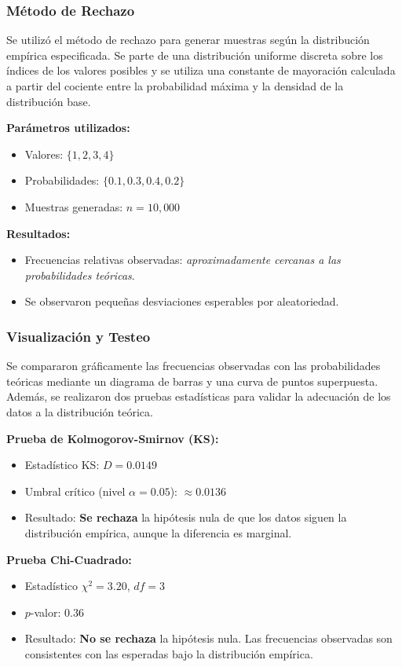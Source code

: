 \documentclass{article}
\begin{document}
\subsubsection{Método de Rechazo}

Se utilizó el método de rechazo para generar muestras según la distribución empírica especificada. Se parte de una distribución uniforme discreta sobre los índices de los valores posibles y se utiliza una constante de mayoración calculada a partir del cociente entre la probabilidad máxima y la densidad de la distribución base.

\textbf{Parámetros utilizados:}
\begin{itemize}
    \item Valores: $\{1, 2, 3, 4\}$
    \item Probabilidades: $\{0.1, 0.3, 0.4, 0.2\}$
    \item Muestras generadas: $n = 10,\!000$
\end{itemize}

\textbf{Resultados:}
\begin{itemize}
    \item Frecuencias relativas observadas: \textit{aproximadamente cercanas a las probabilidades teóricas}.
    \item Se observaron pequeñas desviaciones esperables por aleatoriedad.
\end{itemize}

\subsubsection{Visualización y Testeo}

Se compararon gráficamente las frecuencias observadas con las probabilidades teóricas mediante un diagrama de barras y una curva de puntos superpuesta. Además, se realizaron dos pruebas estadísticas para validar la adecuación de los datos a la distribución teórica.

\textbf{Prueba de Kolmogorov-Smirnov (KS):}
\begin{itemize}
    \item Estadístico KS: $D = 0.0149$
    \item Umbral crítico (nivel $\alpha = 0.05$): $\approx 0.0136$
    \item Resultado: \textbf{Se rechaza} la hipótesis nula de que los datos siguen la distribución empírica, aunque la diferencia es marginal.
\end{itemize}

\textbf{Prueba Chi-Cuadrado:}
\begin{itemize}
    \item Estadístico $\chi^2 = 3.20$, $df = 3$
    \item $p$-valor: $0.36$
    \item Resultado: \textbf{No se rechaza} la hipótesis nula. Las frecuencias observadas son consistentes con las esperadas bajo la distribución empírica.
\end{itemize}
\end{document}
